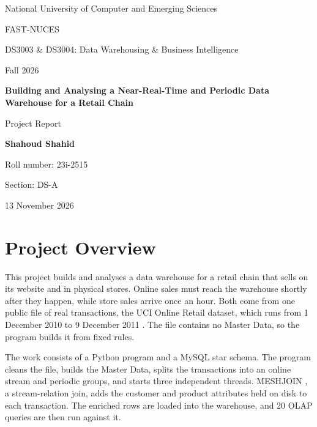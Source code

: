 \documentclass[11pt,a4paper]{article}
\begin{document}
\begin{titlepage}
\thispagestyle{empty}
\centering
\vspace*{3cm}
{\large National University of Computer and Emerging Sciences\par}
\vspace{0.3cm}
{\large FAST-NUCES\par}
\vspace{1.2cm}
{\normalsize DS3003 \& DS3004: Data Warehousing \& Business Intelligence\par}
{\normalsize Fall 2026\par}
\vspace{1.6cm}
{\Huge\bfseries\color{heading} Building and Analysing a Near-Real-Time and Periodic Data Warehouse for a Retail Chain\par}
\vspace{1.2cm}
{\large Project Report\par}
\vspace{1.6cm}
{\Large\bfseries Shahoud Shahid\par}
\vspace{0.3cm}
Roll number: 23i-2515\par
Section: DS-A\par
\vspace{1.2cm}
13 November 2026\par
\end{titlepage}

\section{Project Overview}

This project builds and analyses a data warehouse for a retail chain that sells on its website and in physical stores. Online sales must reach the warehouse shortly after they happen, while store sales arrive once an hour. Both come from one public file of real transactions, the UCI Online Retail dataset, which runs from 1 December 2010 to 9 December 2011 \cite{chen}. The file contains no Master Data, so the program builds it from fixed rules.

The work consists of a Python program and a MySQL star schema. The program cleans the file, builds the Master Data, splits the transactions into an online stream and periodic groups, and starts three independent threads. MESHJOIN \cite{polyzotis}, a stream-relation join, adds the customer and product attributes held on disk to each transaction. The enriched rows are loaded into the warehouse, and 20 OLAP queries are then run against it.
\end{document}
